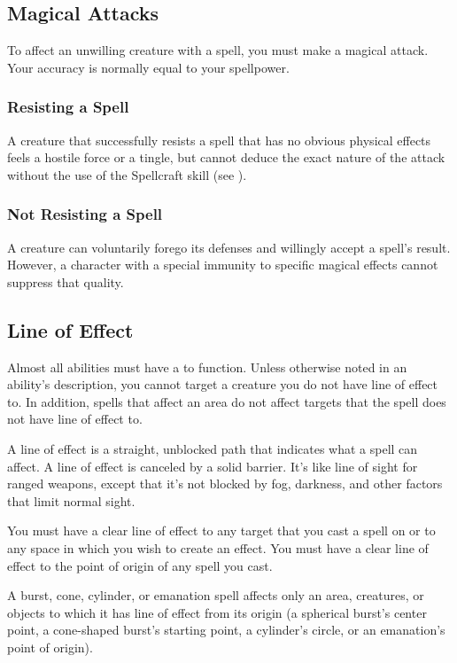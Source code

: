     \subsection{Magical Attacks}

        To affect an unwilling creature with a spell, you must make a magical attack. Your accuracy is normally equal to your spellpower.

        \subsubsection{Resisting a Spell} A creature that successfully resists a spell that has no obvious physical effects feels a hostile force or a tingle, but cannot deduce the exact nature of the attack without the use of the Spellcraft skill (see ).

        \subsubsection{Not Resisting a Spell} A creature can voluntarily forego its defenses and willingly accept a spell's result. However, a character with a special immunity to specific magical effects cannot suppress that quality.

    \subsection{Line of Effect}\label{Line of Effect}
        
        Almost all abilities must have a  to function.
        Unless otherwise noted in an ability's description, you cannot target a creature you do not have line of effect to.
        In addition, spells that affect an area do not affect targets that the spell does not have line of effect to.

        A line of effect is a straight, unblocked path that indicates what a spell can affect. A line of effect is canceled by a solid barrier. It's like line of sight for ranged weapons, except that it's not blocked by fog, darkness, and other factors that limit normal sight.

        You must have a clear line of effect to any target that you cast a spell on or to any space in which you wish to create an effect. You must have a clear line of effect to the point of origin of any spell you cast.

        A burst, cone, cylinder, or emanation spell affects only an area, creatures, or objects to which it has line of effect from its origin (a spherical burst's center point, a cone-shaped burst's starting point, a cylinder's circle, or an emanation's point of origin).

